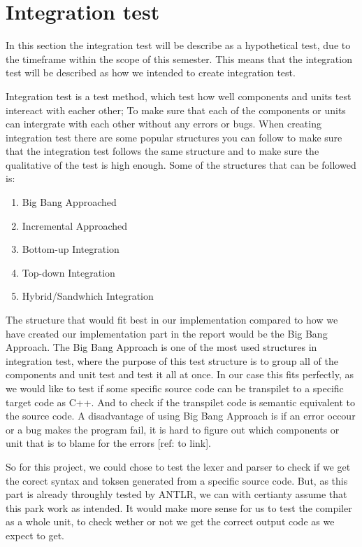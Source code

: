 \section{Integration test}\label{subsec:integrationtest}


In this section the integration test will be describe as a hypothetical test, due to the timeframe within the scope of this semester. This means that the integration test will be described as how we intended to create integration test.

Integration test is a test method, which test how well components and units test intereact with eacher other; To make sure that each of the components or units can intergrate with each other without any errors or bugs. When creating integration test there are some popular structures you can follow to make sure that the integration test follows the same structure and to make sure the qualitative of the test is high enough. Some of the structures that can be followed is:

\begin{enumerate}
    \item Big Bang Approached
    \item Incremental Approached
    \item Bottom-up Integration
    \item Top-down Integration
    \item Hybrid/Sandwhich Integration
\end{enumerate}

The structure that would fit best in our implementation compared to how we have created our implementation part in the report would be the Big Bang Approach. The Big Bang Approach is one of the most used structures in integration test, where the purpose of this test structure is to group all of the components and unit test and test it all at once. In our case this fits perfectly, as we would like to test if some specific source code can be transpilet to a specific target code as C++. And to check if the transpilet code is semantic equivalent to the source code. A disadvantage of using Big Bang Approach is if an error occour or a bug makes the program fail, it is hard to figure out which components or unit that is to blame for the errors [ref: to link].

So for this project, we could chose to test the lexer and parser to check if we get the corect syntax and toksen generated from a specific source code. But, as this part is already throughly tested by ANTLR, we can with certianty assume that this park work as intended. It would make more sense for us to test the compiler as a whole unit, to check wether or not we get the correct output code as we expect to get.

